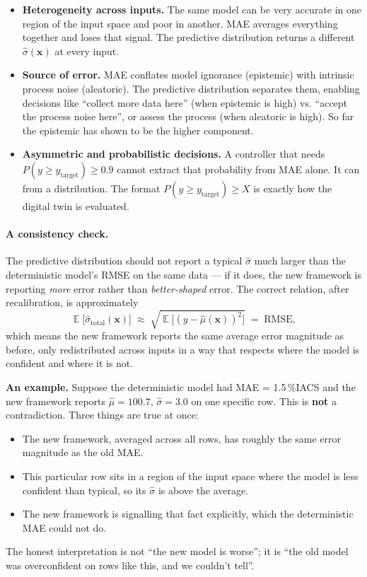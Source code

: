 \documentclass[11pt,a4paper]{article}
\DeclareMathOperator{\E}{\mathbb{E}}
\begin{document}
\begin{itemize}
    \item \textbf{Heterogeneity across inputs.} The same model can be very
    accurate in one region of the input space and poor in another. MAE
    averages everything together and loses that signal. The predictive
    distribution returns a different $\hat\sigma(\bm x)$ at every input.
    \item \textbf{Source of error.} MAE conflates model ignorance (epistemic)
    with intrinsic process noise (aleatoric). The predictive distribution
    separates them, enabling decisions like ``collect more data here'' (when epistemic is high) vs.
    ``accept the process noise here'', or assess the process (when aleatoric is high). So far the epistemic has shown to be the higher component.
    \item \textbf{Asymmetric and probabilistic decisions.} A controller that
    needs $P(y \geq y_{\text{target}}) \geq 0.9$ cannot extract that
    probability from MAE alone. It can from a distribution. The format $P(y \geq y_{\text{target}}) \geq X $ is exactly how the digital twin is evaluated. 
\end{itemize}

\paragraph{A consistency check.} The predictive distribution should not
report a typical $\hat\sigma$ much larger than the deterministic model's
RMSE on the same data --- if it does, the new framework is reporting
\emph{more} error rather than \emph{better-shaped} error. The correct
relation, after recalibration, is approximately
\[
\E\!\big[\hat\sigma_{\text{total}}(\bm x)\big] \;\approx\;
\sqrt{\E\!\big[(y - \hat\mu(\bm x))^2\big]} \;=\; \text{RMSE},
\]
which means the new framework reports the same average error magnitude as
before, only redistributed across inputs in a way that respects where the
model is confident and where it is not.

\begin{intuitionbox}
\textbf{An example.} Suppose the deterministic model had MAE = 1.5\,\%IACS
and the new framework reports $\hat\mu = 100.7$, $\hat\sigma = 3.0$ on one
specific row. This is \textbf{not} a contradiction. Three things are true
at once:
\begin{itemize}
    \item The new framework, averaged across all rows, has roughly the same
    error magnitude as the old MAE.
    \item This particular row sits in a region of the input space where the
    model is less confident than typical, so its $\hat\sigma$ is above the
    average.
    \item The new framework is signalling that fact explicitly, which the
    deterministic MAE could not do.
\end{itemize}
The honest interpretation is not ``the new model is worse''; it is ``the
old model was overconfident on rows like this, and we couldn't tell''.
\end{intuitionbox}
\end{document}
